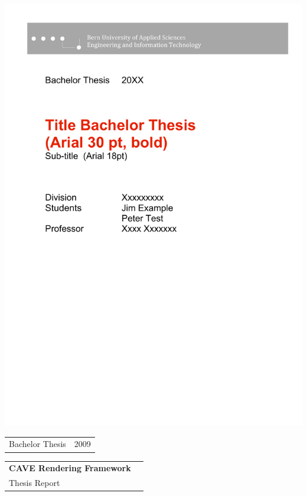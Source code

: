 \begin{titlepage}
 
\begin{flushleft}

\vspace*{-2.0in}\includegraphics[scale=1.1]{../tex-include/figures/title_header}

\vspace*{2in}

\begin{tabular}{p{5cm}p{8cm}}
\Large{Bachelor Thesis} & \Large{2009} \\ 
\end{tabular}

\vspace{1.8cm}
\begin{tabular}{ll}
\Huge{\bfseries CAVE Rendering Framework}\\[0.3cm]
\huge{Thesis Report}\\[1.8cm]
\end{tabular}


\end{flushleft}
\end{titlepage}
